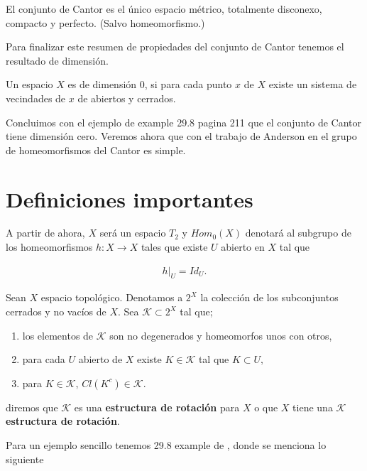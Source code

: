 \documentclass{subfiles}
\begin{document}
\begin{te}\label{te:Cantor_universal}
El conjunto de Cantor es el único espacio métrico, totalmente disconexo, compacto y perfecto. (Salvo homeomorfismo.)
\end{te}


Para finalizar este resumen de propiedades del conjunto de Cantor tenemos el resultado de dimensión. 

\begin{df}
Un espacio $X$ es de dimensión 0, si para cada punto $x$ de $X$ existe un sistema de vecindades de $x$ de abiertos y cerrados.
\end{df}

Concluimos con el ejemplo de \cite{top_willd} example 29.8 pagina 211 que el conjunto de Cantor tiene dimensión cero. Veremos ahora que con el trabajo de Anderson en \cite{ander} el grupo de homeomorfismos del Cantor es simple. 

\section{Definiciones importantes}
A partir de ahora, $X$ será un espacio $T_2$ y  $Hom_0(X)$ denotará al subgrupo de los homeomorfismos $h:X \to X$ tales que existe $U$ abierto en $X$ tal que 

\begin{align*}
h|_U=Id_U.
\end{align*}



\begin{df}
Sean $X$ espacio topológico. Denotamos a $2^X$ la colección de los subconjuntos cerrados y no vacíos de $X$.  Sea $\mathcal{K} \subset 2^X$ tal que;
 	
	\begin{enumerate}
	\item los elementos de $\mathcal{K}$ son no degenerados y homeomorfos unos con otros,
	\item para cada $U$ abierto de $X$ existe $K \in \mathcal{K}$ tal que $K \subset U,$
	\item para $K \in \mathcal{K}$, $Cl(K^c) \in \mathcal{K}.$
	\end{enumerate}

diremos que $\mathcal{K}$ es una \textbf{estructura de rotación} para $X$ o que $X$ tiene una $\mathcal{K}$  \textbf{estructura de rotación}.
\end{df}

Para un ejemplo sencillo tenemos 29.8 example de \cite{top_willd}, donde se menciona lo siguiente
\end{document}
